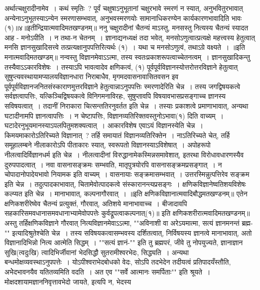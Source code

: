 अर्थात्चक्षुरादीनामेव~। कथं स्मृतिः~? पूर्वं चक्षुषाऽनुभूतानां चक्षुरभावे स्मरणं न स्यात्, अनुभवितुरभावात् अन्येनाऽनुभूतस्याऽन्येन स्मरणासम्भवात्, अनुभवस्मरणयोः
सामानाधिकरण्येन कार्यकारणभावादिति भावः (१)॥४॥इतीन्द्रियात्मवादिमतखण्डनम्॥
ननु चक्षुरादीनां चैतन्यं माऽस्तु, मनसस्तु नित्यस्य चैतन्यं स्यादत आह - मनोऽपीति~। न तथा-न चेतनम्~। ज्ञानाद्यनध्यक्षं तदा भवेत्, मनसोऽणुत्वात्प्रत्यक्षे
महत्त्वस्य हेतुत्वात् मनसि ज्ञानसुखादिसत्त्वे तत्प्रत्यक्षानुपपत्तिरित्यर्थः (१)~। यथा च मनसोऽणुत्वं, तथाऽग्रे वक्ष्यते~।
॥इति मनात्मवादिमतखण्डम्॥
नन्वस्तु विज्ञानमेवाऽऽत्मा, तस्य स्वतःप्रकाशरूपत्वाच्चेतनत्वम्~। ज्ञानसुखादिकन्तु तस्यैवाऽऽकारविशेषः~। तस्याऽपि भावत्वादेव क्षणिकत्वं, (१)
पूर्वपूर्वविज्ञानस्योत्तरोत्तरविज्ञाने हेतुत्वात् सुषुप्त्यवस्थायामप्यालयविज्ञानधारा निराबाधैव, मृगमदवासनावासितवसन इव पूर्वपूर्वविज्ञानजनितसंस्काराणमुत्तरविज्ञाने
हेतुत्वान्नाऽनुपपत्तिः स्मरणादेरिति चेन्न~। तस्य जगद्विषयकत्वे सर्वज्ञत्वापत्तिः, यत्किञ्चिद्विषयकत्वे विनिगमनाविरहः, सुषुप्तावपि विषयावभासप्रसङ्गाच्च ज्ञानस्य
सविषयत्वात्~। तदानीं निराकारा चित्सन्ततिरनुवर्तत इति चेन्न~। तस्याः प्रकाशत्वे प्रमाणाभावात्, अन्यथा घटादीनामपि ज्ञानत्वापत्तिः~। न चेष्टापत्तिः,
विज्ञानव्यतिरिक्तवस्तुनोऽभावा(१) दिति वाच्यम्~। घटादेरनुभूयमानस्याऽपलपितुमशक्यत्वात्~। आकारविशेष एवाऽयं विज्ञानस्येति चेन्न~। किमयमाकारोऽतिरिच्यते विज्ञानात्~?
तर्हि समायातं विज्ञानव्यतिरिक्तेन~। नाऽतिरिच्यते चेत्, तर्हि समूहालम्बने नीलाकारोऽपि पीताकारः स्यात्, स्वरूपतो विज्ञानस्याऽविशेषात्~। अपोहरूपो नीलत्वादिर्विज्ञानधर्म
इति चेन्न~। नीलत्वादीनां विरुद्धानामेकस्मिन्नसमावेशात्, इतरथा विरोधावधारणस्यैव दुरुपपादत्वात्~। नवा वासनासङ्क्रमः सम्भवति, मातृपुत्रयोरपि वासनासङ्क्रमप्रसङ्गात्~।
न चोपादानोपादेयभावो नियामक इति वाच्यम्~। वासनायाः सङ्क्रमासम्भवात्~। उत्तरस्मिन्नुत्पत्तिरेव सङ्क्रम इति चेन्न~। तदुत्पादकाभावात्, चितामेवोत्पादकत्वे संस्कारानन्त्यप्रसङ्गः~।
क्षणिकविज्ञानेष्वतिशयविशेषः कल्प्यत इति चेन्न~। मानाभावात्, कल्पनागौरवात्~।
॥इति क्षणिकविज्ञानात्मवादिबौद्धमतखण्डनम्॥
एतेन क्षणिकशरीरेष्वेव चैतन्यं प्रत्युक्तं, गौरवात्, अतिशये मानाभावाच्च~। बीजादावपि सहकारिसमवधानासमवधानाभ्यामेवोपपत्तेः कुर्वद्रूपत्वाकल्पनात्(१)॥
इति क्षणिकशरीरात्मवादिमतखण्डनम्॥
अस्तु तर्हिक्षणिकविज्ञाने गौरवात् नित्यविज्ञानमेवाऽऽत्मा, ""अविनाशी वा अरेऽयमात्मा, सत्यं ज्ञानमनन्तं ब्रह्म-"" इत्यादिश्रुतेश्चेति चेन्न~। तस्य सविषयकत्वासम्भवस्य
दर्शितत्वात्, निर्विषयस्य ज्ञानत्वे मानाभावात्, अतो विज्ञानादिभिन्नो नित्य आत्मेति सिद्धम्~। ""सत्यं ज्ञानं-"" इति तु ब्रह्मपरं, जीवे तु नोपयुज्यते, ज्ञानाज्ञान
सुखि(त्वदुःखि) त्वादिभिर्जीवानां भेदसिद्धौ सुतरामीश्वरभेदः, सिद्ध्यति~। अन्यथा बन्धमोक्षव्यवस्थाऽनुपपत्तेः~। योऽपीश्वराभेदबोधको वेदः, सोऽपि तदभेदेन तदीयत्वं
प्रतिपादयँस्तौति, अभेेदभावनयैव यतितव्यमिति वदति~। अत एव ""सर्वे आत्मानः समर्पिताः"" इति श्रूयते~। मोक्षदशायामज्ञाननिवृत्तावभेदो जायते, इत्यपि न, भेदस्य
